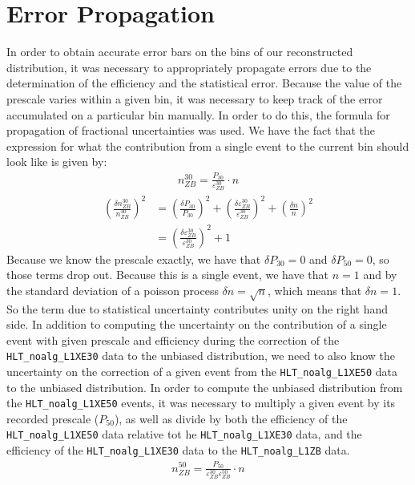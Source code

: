 \section{Error Propagation}
In order to obtain accurate error bars on the bins of our reconstructed distribution, it was necessary to appropriately propagate errors due to the determination of the efficiency and the statistical error. 
Because the value of the prescale varies within a given bin, it was necessary to keep track of the error accumulated on a particular bin manually. 
In order to do this, the formula for propagation of fractional uncertainties was used. 
We have the fact that the expression for what the contribution from a single event to the current bin should look like is given by:
\begin{align}
		n_{ZB}^{30}=\frac{P_{30}}{\varepsilon_{ZB}^{30}}\cdot n
\end{align}
\begin{align}
		\left(\frac{\delta n_{ZB}^{30}}{n_{ZB}^{30}}\right)^2&=\left( \frac{\delta P_{30}}{P_{30}} \right)^2+\left( \frac{\delta \varepsilon_{ZB}^{30}}{\varepsilon_{ZB}^{30}} \right)^2+\left( \frac{\delta n}{n} \right)^2\\
		&=\left( \frac{\delta \varepsilon_{ZB}^{30}}{\varepsilon_{ZB}^{30}} \right)^2+1
\end{align}
Because we know the prescale exactly, we have that $\delta P_{30}=0$ and $\delta P_{50}=0$, so those terms drop out.
Because this is a single event, we have that $n=1$ and by the standard deviation of a poisson process $\delta n=\sqrt{n}$, which means that $\delta n=1$. So the term due to statistical uncertainty contributes unity on the right hand side.
In addition to computing the uncertainty on the contribution of a single event with given prescale and efficiency during the correction of the \texttt{HLT\_noalg\_L1XE30} data to the unbiased distribution, we need to also know the uncertainty on the correction of a given event from the \texttt{HLT\_noalg\_L1XE50} data to the unbiased distribution.
In order to compute the unbiased distribution from the \texttt{HLT\_noalg\_L1XE50} events, it was necessary to multiply a given event by its recorded prescale ($P_{50}$), as well as divide by both the efficiency of the \texttt{HLT\_noalg\_L1XE50} data relative tot he \texttt{HLT\_noalg\_L1XE30} data, and the efficiency of the \texttt{HLT\_noalg\_L1XE30} data to the \texttt{HLT\_noalg\_L1ZB} data.
\begin{align}
		n_{ZB}^{50}=\frac{P_{50}}{\varepsilon_{ZB}^{30}\varepsilon_{ZB}^{50}}\cdot n
\end{align}
